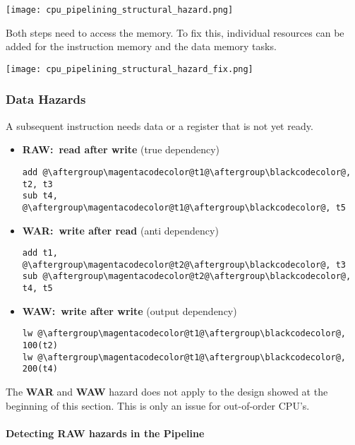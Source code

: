 \texttt{[image: cpu\_pipelining\_structural\_hazard.png]}

Both steps need to access the memory. To fix this, individual resources can be added for the instruction memory and the data memory tasks.

\begin{center}
    \texttt{[image: cpu\_pipelining\_structural\_hazard\_fix.png]}
\end{center}

\subsubsection{Data Hazards}\label{data hazards}

A subsequent instruction needs data or a register that is not yet ready.

\begin{itemize}
    \item \textbf{RAW:\ read after write} (true dependency)
          \begin{lstlisting}[escapechar=@]
add @\aftergroup\magentacodecolor@t1@\aftergroup\blackcodecolor@, t2, t3
sub t4, @\aftergroup\magentacodecolor@t1@\aftergroup\blackcodecolor@, t5
\end{lstlisting}
    \item \textbf{WAR:\ write after read} (anti dependency)
          \begin{lstlisting}[escapechar=@]
add t1, @\aftergroup\magentacodecolor@t2@\aftergroup\blackcodecolor@, t3
sub @\aftergroup\magentacodecolor@t2@\aftergroup\blackcodecolor@, t4, t5
\end{lstlisting}
    \item \textbf{WAW:\ write after write} (output dependency)
          \begin{lstlisting}[escapechar=@]
lw @\aftergroup\magentacodecolor@t1@\aftergroup\blackcodecolor@, 100(t2)
lw @\aftergroup\magentacodecolor@t1@\aftergroup\blackcodecolor@, 200(t4)
\end{lstlisting}
\end{itemize}

The \textbf{WAR} and \textbf{WAW} hazard does not apply to the design showed at the beginning of this section. This is only an issue for out-of-order CPU's.

\paragraph{Detecting RAW hazards in the Pipeline}

